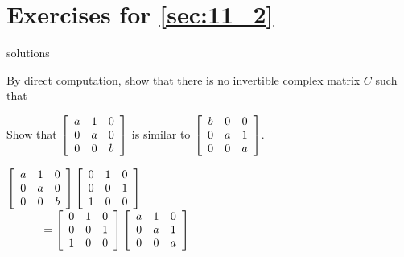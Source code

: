 \section*{Exercises for \ref{sec:11_2}}

\begin{Filesave}{solutions}
\end{Filesave}

\begin{multicols}{2}
\begin{ex}
By direct computation, show that there is no invertible complex matrix $C$ such that
\end{ex}

\begin{ex}
Show that $\left[ \begin{array}{ccc}
a & 1 & 0 \\
0 & a & 0 \\
0 & 0 & b
\end{array} \right]$
 is similar to $\left[ \begin{array}{ccc}
 b & 0 & 0 \\
 0 & a & 1 \\
 0 & 0 & a
 \end{array} \right]$.

\begin{sol}
$\left[ \begin{array}{ccc}
a & 1 & 0 \\
0 & a & 0 \\
0 & 0 & b
\end{array} \right] \left[ \begin{array}{ccc}
0 & 1 & 0 \\
0 & 0 & 1 \\
1 & 0 & 0
\end{array} \right]$ \\ ${}\hspace*{3em} = \left[ \begin{array}{ccc}
0 & 1 & 0 \\
0 & 0 & 1 \\
1 & 0 & 0
\end{array} \right] \left[ \begin{array}{ccc}
a & 1 & 0 \\
0 & a & 1 \\
0 & 0 & a
\end{array} \right]$
\end{sol}
\end{ex}


\end{multicols}
